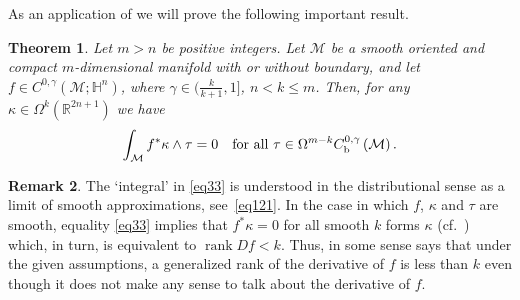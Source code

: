 \documentclass[intlimits,12pt,reqno]{amsart}
\newcommand{\cM}{\mathcal M}
\newcommand{\bbbh}{\mathbb H}
\newcommand{\R}{\mathbb R}
\numberwithin{equation}{section}
\newtheorem{theorem}{Theorem}[section]
\theoremstyle{definition}
\newtheorem{remark}[theorem]{Remark}
\begin{document}
As an application of  we will prove the following important result.
\begin{theorem}
\label{T47}
Let $m>n$ be positive integers. Let $\cM$ be a smooth oriented and compact $m$-dimensional manifold with or without boundary, and let
$f\in C^{0,\gamma}(\cM;\bbbh^n)$, where $\gamma\in(\frac{k}{k+1},1]$, $n<k\leq m$.
Then, for any $\kappa\in \Omega^k(\R^{2n+1})$ we have
\begin{equation}
\label{eq33}
\int_{\cM} f^*\kappa\wedge\tau = 0
\quad
\text{for all}\
\tau\in \Omega^{m-k}C_{\rm b}^{0,\gamma}\left(\cM\right).
\end{equation}
\end{theorem}
\begin{remark}\label{R47}
The `integral' in \eqref{eq33} is understood in the distributional sense 
as a limit of smooth approximations, see~\eqref{eq121}.
In the case in which $f$, $\kappa$ and $\tau$ are smooth, equality \eqref{eq33} implies that $f^*\kappa=0$ for all smooth $k$ forms $\kappa$ (cf.\ \cite[Lemma~4.3]{HST14}) which, in turn, is equivalent to $\operatorname{rank} Df<k$. Thus, in some sense  says that under the given assumptions, a generalized rank of the derivative of $f$ is less than $k$ even though it does not make any sense to talk about the derivative of $f$.
\end{remark}
\end{document}
